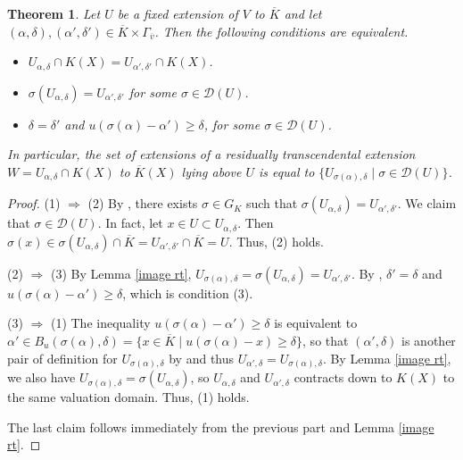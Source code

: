 \documentclass[10pt]{article}
\numberwithin{equation}{section}
\newtheorem{Thm}[equation]{Theorem}
\theoremstyle{definition}
\theoremstyle{definition}
\newcommand{\olK}{\overline{K}}
\begin{document}
\begin{Thm}\label{Conjugate Rt ext}
Let $U$ be a fixed extension of $V$ to $\overline{K}$ and
let $(\alpha,\delta),(\alpha',\delta')\in\overline{K}\times\Gamma_{\overline{v}}$.
Then the following conditions are equivalent.
\begin{itemize}
\item[{\em (1)}] $U_{\alpha,\delta}\cap K(X)=U_{\alpha',\delta'}\cap K(X)$.
\item[{\em (2)}] $\sigma(U_{\alpha,\delta})=U_{\alpha',\delta'}$ for some $\sigma\in\mathcal{D}(U)$.
\item[{\em (3)}] $\delta=\delta'$ and $ u(\sigma(\alpha)-\alpha')\geq\delta$, for some $\sigma\in \mathcal{D}(U)$.
\end{itemize}
In particular, the set of extensions of a residually transcendental extension $W=U_{\alpha,\delta}\cap K(X)$ to $\overline{K}(X)$ lying above $U$ is equal to $\{U_{\sigma(\alpha),\delta}\mid \sigma\in \mathcal{D}(U)\}$.
\end{Thm}

\begin{proof}
(1) $\Rightarrow$ (2) By  \cite[Conjugation Theorem 3.2.15]{EngPre},   there exists $\sigma\in G_K$ such that $\sigma(U_{\alpha,\delta})=U_{\alpha',\delta'}$. We claim that $\sigma\in \mathcal D(U)$. In fact, let $x\in U\subset U_{\alpha,\delta}$. Then $\sigma(x)\in\sigma(U_{\alpha,\delta})\cap \overline K=U_{\alpha',\delta'}\cap \overline K=U$. Thus, (2) holds.

(2) $\Rightarrow$ (3) By Lemma \ref{image rt}, $U_{\sigma(\alpha),\delta}= \sigma(U_{\alpha,\delta})= U_{\alpha',\delta'}$. 
By \cite[Proposition 1.1]{APZAll},  $\delta'=\delta$ and $u(\sigma(\alpha)-\alpha')\geq\delta$, which is condition (3).

(3) $\Rightarrow$ (1) The inequality $u(\sigma(\alpha)-\alpha')\geq\delta$ is equivalent to $\alpha'\in B_u(\sigma(\alpha),\delta)=\{x\in\olK \mid u(\sigma(\alpha)-x)\geq \delta\}$, so that $(\alpha',\delta)$ is another pair of definition for $U_{\sigma(\alpha),\delta}$ by \cite[Proposition 3]{AlePop} and thus $U_{\alpha',\delta}=U_{\sigma(\alpha),\delta}$. By  Lemma \ref{image rt}, we also have $U_{\sigma(\alpha),\delta}=\sigma(U_{\alpha,\delta})$, so $U_{\alpha,\delta}$  
and $U_{\alpha',\delta}$ contracts down to $K(X)$ to the same valuation domain. Thus, (1) holds.

The last claim follows immediately from the previous part and Lemma \ref{image rt}.
\end{proof}
\end{document}
